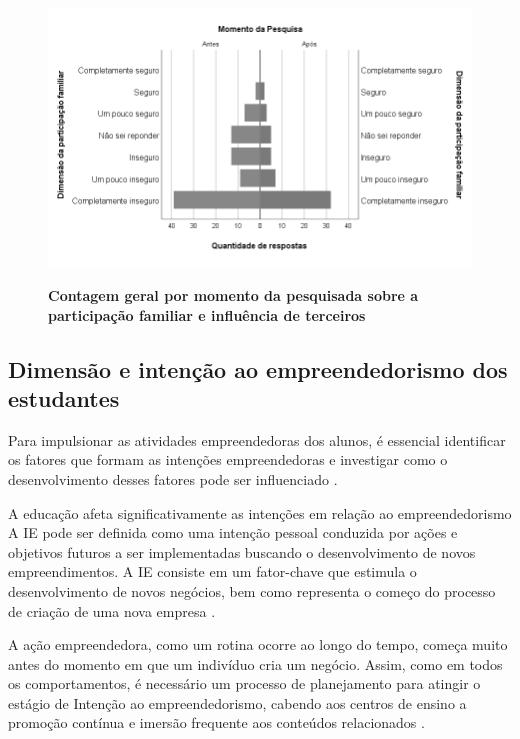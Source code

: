 \begin{figure}[H]
\centering
\caption{\textbf{Contagem geral por momento da pesquisada sobre a participação familiar e influência de terceiros}}
\includegraphics[scale=0.6]{Imagens/dimensao_familiar.png}
\label{figura_60}
\end{figure}


\subsection{Dimensão e intenção ao empreendedorismo dos estudantes}

Para impulsionar as atividades empreendedoras dos alunos, é essencial identificar os fatores que formam as intenções empreendedoras e investigar como o desenvolvimento desses fatores pode ser influenciado \cite{gubik_entrepreneurial_2019}. 

A educação afeta significativamente as intenções em relação ao empreendedorismo
A IE pode ser definida como uma intenção pessoal conduzida por ações e objetivos futuros a ser implementadas buscando o desenvolvimento de novos empreendimentos. 
A IE consiste em um fator-chave que estimula o desenvolvimento de novos negócios, bem como representa o começo do processo de criação de uma nova empresa \cite{vasconcellos-guedes_e-surveys:_2007}.

A ação empreendedora, como um rotina ocorre ao longo do tempo, começa muito antes do momento em que um indivíduo cria um negócio. Assim, como em todos os comportamentos, é necessário um processo de planejamento para atingir o estágio de Intenção ao empreendedorismo, cabendo aos centros de ensino a promoção contínua e imersão frequente aos conteúdos relacionados \cite{garcia-rodriguez_entrepreneurial_2017}. 

